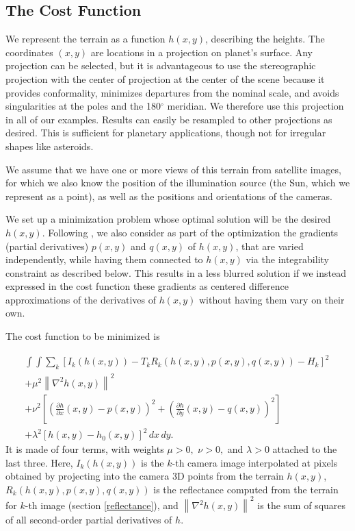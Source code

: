 \documentclass[draft,linenumbers]{agujournal}
\begin{document}
\subsection{The Cost Function}

We represent the terrain as a function $h(x,y)$, describing the
heights.  The coordinates $(x,y)$ are locations in a projection on planet's surface. Any projection can be selected, but it is advantageous to use the stereographic projection with the center of
projection at the center of the scene because it provides conformality, minimizes departures from the nominal scale, and avoids singularities at the poles and the 180$^{\circ}$ meridian.  We therefore use this projection in all of our examples.  Results can easily be resampled to other projections as desired.
This is sufficient for planetary applications,
though not for irregular shapes like asteroids. 

We assume that we
have one or more views of this terrain from satellite images, for
which we also know the position of the illumination source (the
Sun, which we represent as a point), as well as the positions and
orientations of the cameras. 

We set up a minimization problem whose optimal solution will be the desired $h(x,y).$
Following \citet{horn1990height}, we also consider as part of the optimization
the gradients (partial derivatives) $p(x,y)$ and $q(x, y)$ of $h(x, y)$,
that are varied independently, while having them connected to 
$h(x, y)$ via the integrability constraint as described below. This results in a less blurred 
solution if we instead expressed in the cost function these gradients as 
centered difference approximations of the derivatives of $h(x, y)$ without having them vary on their own. 

The cost function to be minimized is

\begin{eqnarray}\label{cost}
\int\!\! \int \! \sum_k \left[ I_k(h(x, y)) - T_k 
R_k(h(x, y), p(x, y), q(x,y)) - H_k \right]^2\, \nonumber \\             
+ \mu^2 \left\|\nabla^2 h(x, y) \right\|^2  \nonumber \\
+ \nu^2  
\left[ 
\left( \frac{\partial h}{\partial x}(x, y) - p(x, y)\right)^2  
+
\left( \frac{\partial h}{\partial y}(x, y) - q(x, y)\right)^2  
 \right] \nonumber \\
 + \lambda^2  \left[ h(x, y) - h_0(x, y) \right]^2
\, dx\, dy.
\end{eqnarray}
It is made of four terms, with weights $\mu > 0,$ $\nu>0,$ and $\lambda > 0$
attached to the last three. Here, $I_k(h(x, y))$ is the $k$-th camera image interpolated at
pixels obtained by projecting into the camera 3D points from the terrain
$h(x, y)$, $R_k(h(x, y), p(x, y), q(x,y))$ is the reflectance computed from the terrain for $k$-th image (section \ref{reflectance}), and $\left\|\nabla^2 h(x, y) \right\|^2 $ is the sum
of squares of all second-order partial derivatives of $h$.
\end{document}
